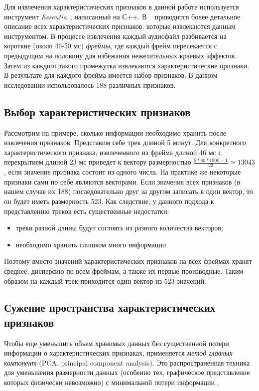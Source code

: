 Для извлечения характеристических признаков в данной работе используется инструмент \emph{Essentia}~\cite{essentia}, написанный на С++. 
В ~\cite{essentia} приводится более детальное описание всех характеристических признаков, которые извлекаются данным инструментом. 
В процессе извлечения каждый аудиофайл разбивается на короткие (около 46-50 мс) \emph{фреймы}, где каждый фрейм пересекается с предыдущим 
на половину для избежания нежелательных краевых эффектов.
Затем из каждого такого промежутка извлекаются характеристические признаки. В результате для каждого фрейма имеется набор признаков.
В данном исследовании использовалось 188 различных признаков.

\subsection{Выбор характеристических признаков}

Рассмотрим на примере, сколько информации необходимо хранить после извлечения признаков.
Представим себе трек длиной 5 минут. Для конкретного характеристического признака, извлеченного из фрейма длиной 46 мс с перекрытием длиной
23 мс приведет к вектору размерностью $\frac{5 * 60 * 1000 - 1}{23} \simeq 13043$, если значение признака состоит из одного числа. На практике
же некоторые признаки сами по себе являются векторами. Если значения всех признаков (в нашем случае их 188) последовательно друг за другом 
записать в один вектор, то он будет иметь размерность 523.
Как следствие, у данного подхода к представлению треков есть существенные недостатки:
\begin{itemize}
 \item треки разной длины будут состоять из разного количества векторов;
 \item необходимо хранить слишком много информации.
\end{itemize}
Поэтому вместо значений характеристических признаков на всех фреймах хранят среднее, дисперсию по всем фреймам, а также их первые производные.
Таким образом на каждый трек приходится один вектор из 523 значений.

\subsection{Сужение пространства характеристических признаков}

Чтобы еще уменьшить объем хранимых данных без существенной потери информации о характеристических признаках, применяется \emph{метод главных компонент} (PCA, principal component analysis).
Это распространенная техника для уменьшения размерности данных (особенно тех, графическое представление которых физически невозможно) с минимальной потери информации \cite{msordo_thesis, pca}. 

